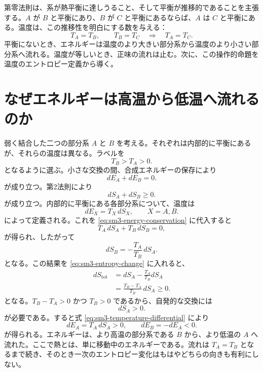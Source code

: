 第零法則は、系が熱平衡に達しうること、そして平衡が推移的であることを主張する。\(A\) が \(B\) と平衡にあり、\(B\) が \(C\) と平衡にあるならば、\(A\) は \(C\) と平衡にある。温度は、この推移性を明白にする数を与える：
\[
 T_A=T_B,\qquad T_B=T_C
 \quad\Longrightarrow\quad
 T_A=T_C.
\]
平衡にないとき、エネルギーは温度のより大きい部分系から温度のより小さい部分系へ流れる。温度が等しいとき、正味の流れは止む。次に、この操作的命題を温度のエントロピー定義から導く。

\section{なぜエネルギーは高温から低温へ流れるのか}

弱く結合した二つの部分系 \(A\) と \(B\) を考える。それぞれは内部的に平衡にあるが、それらの温度は異なる。ラベルを
\begin{equation}
 T_B>T_A>0.
 \label{eq:sm3-temperature-order}
\end{equation}
となるように選ぶ。小さな交換の間、合成エネルギーの保存により
\begin{equation}
 dE_A+dE_B=0.
 \label{eq:sm3-energy-conservation}
\end{equation}
が成り立つ。第2法則により
\begin{equation}
 dS_A+dS_B\geq0.
 \label{eq:sm3-entropy-change}
\end{equation}
が成り立つ。内部的に平衡にある各部分系について、温度は
\begin{equation}
 dE_X=T_X\,dS_X,
 \qquad X=A,B.
 \label{eq:sm3-temperature-differential}
\end{equation}
によって定義される。これを \eqref{eq:sm3-energy-conservation} に代入すると
\begin{equation}
 T_A\,dS_A+T_B\,dS_B=0,
\end{equation}
が得られ、したがって
\begin{equation}
 dS_B=-\frac{T_A}{T_B}\,dS_A.
 \label{eq:sm3-dsb}
\end{equation}
となる。この結果を \eqref{eq:sm3-entropy-change} に入れると、
\begin{align}
 dS_{\mathrm{tot}}
 &=dS_A-\frac{T_A}{T_B}dS_A\\
 &=\frac{T_B-T_A}{T_B}\,dS_A\geq0.
 \label{eq:sm3-flow-entropy}
\end{align}
となる。\(T_B-T_A>0\) かつ \(T_B>0\) であるから、自発的な交換には
\[
 dS_A>0.
\]
が必要である。すると式 \eqref{eq:sm3-temperature-differential} により
\begin{equation}
 dE_A=T_A\,dS_A>0,
 \qquad
 dE_B=-dE_A<0.
 \label{eq:sm3-hot-to-cold}
\end{equation}
が得られる。エネルギーは、より高温の部分系である \(B\) から、より低温の \(A\) へ流れた。ここで熱とは、単に移動中のエネルギーである。流れは \(T_A=T_B\) となるまで続き、そのとき一次のエントロピー変化はもはやどちらの向きも有利にしない。

